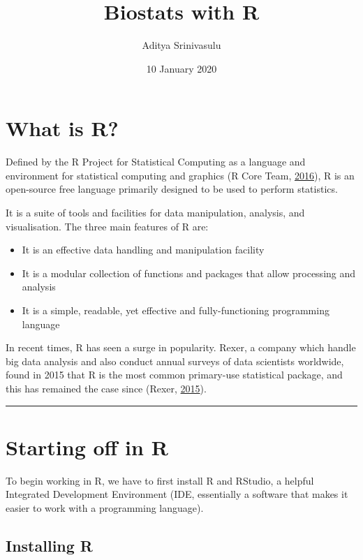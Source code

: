 \documentclass[]{tufte-handout}
\title{Biostats with R}
\author{Aditya Srinivasulu}
\date{10 January 2020}
\begin{document}
\maketitle




\hypertarget{what-is-r}{%
\section{What is R?}\label{what-is-r}}

Defined by the R Project for Statistical Computing as a language and
environment for statistical computing and graphics (R Core Team,
\protect\hyperlink{ref-R-base}{2016}), R is an open-source free language
primarily designed to be used to perform statistics.

It is a suite of tools and facilities for data manipulation, analysis,
and visualisation. The three main features of R are:

\begin{itemize}
\item
  It is an effective data handling and manipulation facility
\item
  It is a modular collection of functions and packages that allow
  processing and analysis
\item
  It is a simple, readable, yet effective and fully-functioning
  programming language
\end{itemize}

In recent times, R has seen a surge in popularity. Rexer, a company
which handle big data analysis and also conduct annual surveys of data
scientists worldwide, found in 2015 that R is the most common
primary-use statistical package, and this has remained the case since
(Rexer, \protect\hyperlink{ref-rexer2015}{2015}).

\begin{center}\rule{0.5\linewidth}{\linethickness}\end{center}

\hypertarget{starting-off-in-r}{%
\section{Starting off in R}\label{starting-off-in-r}}

To begin working in R, we have to first install R and RStudio, a helpful
Integrated Development Environment (IDE, essentially a software that
makes it easier to work with a programming language).

\hypertarget{installing-r}{%
\subsection{Installing R}\label{installing-r}}
\end{document}
